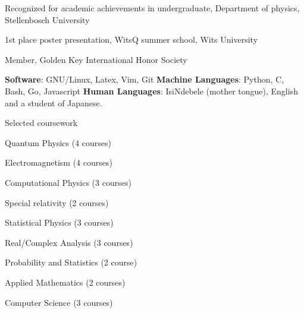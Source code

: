 \documentclass{edelgas-resume}
\begin{document}
    \begin{position}{}{}
        \item Recognized for academic achievements in undergraduate, Department of physics, Stellenbosch University
        \item 1st place poster presentation, WitsQ summer school, Wits
            University
        \item Member, Golden Key International Honor Society
    \end{position}



    \vspace{-1em}
    \textbf{Software}: GNU/Linux, Latex, Vim, Git\newline
    \textbf{Machine Languages}: Python, C, Bash, Go, Javascript\newline
    \textbf{Human Languages}: IsiNdebele (mother tongue), English and a student of Japanese.
    \vspace{1.5em}

    \vspace{-1.0em}
    \begin{position}{Selected coursework}{}
        \item {Quantum Physics (4 courses)}
        \item {Electromagnetism (4 courses)}
        \item {Computational Physics (3 courses)}
        \item {Special relativity (2 courses)}
        \item {Statistical Physics (3 courses)}
        \item {Real/Complex Analysis (3 courses)}
        \item {Probability and Statistics (2 course)}
        \item {Applied Mathematics (2 courses)} 
        \item {Computer Science (3 courses)}
    \end{position}
\end{document}
